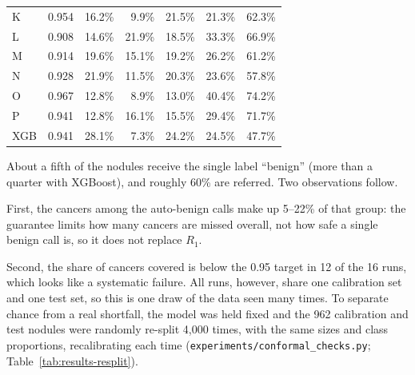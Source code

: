 \begin{table}[ht]
\begin{tabular}{lrrrrrr}
    K & 0.954 & 16.2\% &  9.9\% & 21.5\% & 21.3\% & 62.3\% \\
    L & 0.908 & 14.6\% & 21.9\% & 18.5\% & 33.3\% & 66.9\% \\
    M & 0.914 & 19.6\% & 15.1\% & 19.2\% & 26.2\% & 61.2\% \\
    N & 0.928 & 21.9\% & 11.5\% & 20.3\% & 23.6\% & 57.8\% \\
    O & 0.967 & 12.8\% &  8.9\% & 13.0\% & 40.4\% & 74.2\% \\
    P & 0.941 & 12.8\% & 16.1\% & 15.5\% & 29.4\% & 71.7\% \\
    \midrule
    XGB & 0.941 & 28.1\% & 7.3\% & 24.2\% & 24.5\% & 47.7\% \\
    \bottomrule
  \end{tabular}
\end{table}

About a fifth of the nodules receive the single label ``benign'' (more than a quarter with
XGBoost), and roughly 60\% are referred. Two observations follow.

First, the cancers among the auto-benign calls make up 5--22\% of that group: the guarantee limits
how many cancers are missed overall, not how safe a single benign call is, so it does not replace
$R_1$.

Second, the share of cancers covered is below the 0.95 target in 12 of the 16 runs, which looks
like a systematic failure. All runs, however, share one calibration set and one test set, so this
is one draw of the data seen many times. To separate chance from a real shortfall, the model was
held fixed and the 962 calibration and test nodules were randomly re-split 4,000 times, with the
same sizes and class proportions, recalibrating each time (\texttt{experiments/conformal\_checks.py};
Table~\ref{tab:results-resplit}).

